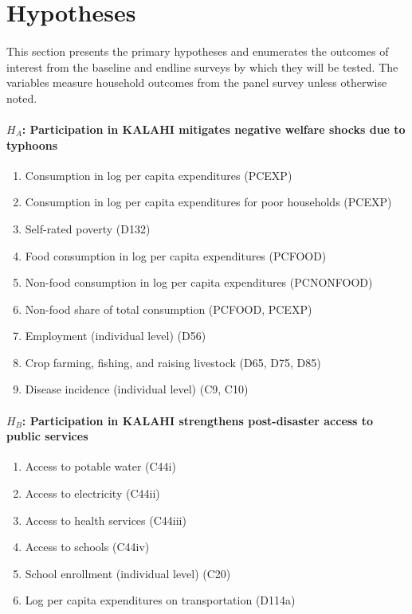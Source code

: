 \documentclass[12pt]{article}
\begin{document}


\section{Hypotheses}

	\paragraph{} This section presents the primary hypotheses and enumerates the outcomes of interest from the baseline and endline surveys by which they will be tested. The variables measure household outcomes from the panel survey unless otherwise noted. 

	\paragraph{$H_A$: Participation in KALAHI mitigates negative welfare shocks due to typhoons}

		\begin{enumerate}
		\item Consumption in log per capita expenditures (PCEXP)
		\item Consumption in log per capita expenditures for poor households (PCEXP)
		\item Self-rated poverty (D132)
		\item Food consumption in log per capita expenditures (PCFOOD)
		\item Non-food consumption in log per capita expenditures (PCNONFOOD)
		\item Non-food share of total consumption (PCFOOD, PCEXP)
		\item Employment (individual level) (D56)
		\item Crop farming, fishing, and raising livestock (D65, D75, D85)
		\item Disease incidence (individual level) (C9, C10)
		\end{enumerate}

	\paragraph{$H_B$: Participation in KALAHI strengthens post-disaster access to public services}
		
		\begin{enumerate}
		\item Access to potable water (C44i)
		\item Access to electricity (C44ii)
		\item Access to health services (C44iii)
		\item Access to schools (C44iv)
		\item School enrollment (individual level) (C20)
		\item Log per capita expenditures on transportation (D114a)
		\end{enumerate}
\end{document}

